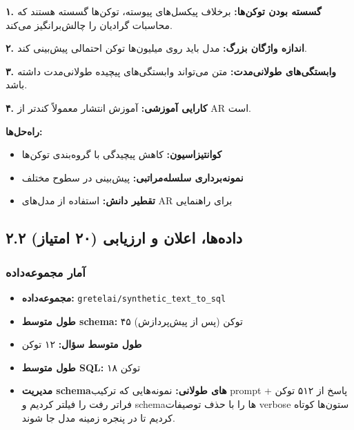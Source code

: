\documentclass[12pt,a4paper]{article}
\theoremstyle{definition}
\begin{document}
\textbf{۱. گسسته بودن توکن‌ها:}
برخلاف پیکسل‌های پیوسته، توکن‌ها گسسته هستند که محاسبات گرادیان را چالش‌برانگیز می‌کند.

\textbf{۲. اندازه واژگان بزرگ:}
مدل باید روی میلیون‌ها توکن احتمالی پیش‌بینی کند.

\textbf{۳. وابستگی‌های طولانی‌مدت:}
متن می‌تواند وابستگی‌های پیچیده طولانی‌مدت داشته باشد.

\textbf{۴. کارایی آموزشی:}
آموزش انتشار معمولاً کندتر از AR است.

\textbf{راه‌حل‌ها:}
\begin{itemize}
    \item \textbf{کوانتیزاسیون:} کاهش پیچیدگی با گروه‌بندی توکن‌ها
    \item \textbf{نمونه‌برداری سلسله‌مراتبی:} پیش‌بینی در سطوح مختلف
    \item \textbf{تقطیر دانش:} استفاده از مدل‌های AR برای راهنمایی
\end{itemize}

\subsection{۲.۲ داده‌ها، اعلان و ارزیابی (۲۰ امتیاز)}

\subsubsection*{آمار مجموعه‌داده}
\begin{itemize}
    \item \textbf{مجموعه‌داده:} \texttt{gretelai/synthetic\_text\_to\_sql}
    \item \textbf{طول متوسط schema:} ۴۵ توکن (پس از پیش‌پردازش)
    \item \textbf{طول متوسط سؤال:} ۱۲ توکن
    \item \textbf{طول متوسط SQL:} ۱۸ توکن
    \item \textbf{مدیریت schemaهای طولانی:} نمونه‌هایی که ترکیب prompt + پاسخ از ۵۱۲ توکن فراتر رفت را فیلتر کردیم و schemaها را با حذف توصیفات verbose ستون‌ها کوتاه کردیم تا در پنجره زمینه مدل جا شوند.
\end{itemize}
\end{document}
